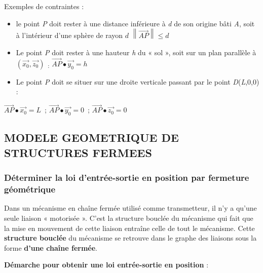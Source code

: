 Exemples de contraintes :

\begin{itemize}
\item
  le point \emph{P} doit rester à une distance inférieure à \emph{d} de
  son origine bâti \emph{A}, soit à l'intérieur d'une sphère de rayon
  \(d\) \(\left\| \overrightarrow{AP} \right\| \leq d\)
\item
  Le point \emph{P} doit rester à une hauteur \emph{h} du « sol », soit
  sur un plan parallèle à
  \((\overrightarrow{x_{0}},\overrightarrow{z_{0}})\)\textsubscript{~:}
  \(\overrightarrow{AP} \bullet \overrightarrow{y_{0}} = h\)
\item
  Le point \emph{P} doit se situer sur une droite verticale passant par
  le point \emph{D}(\emph{L},0,0) :
\end{itemize}

\(\overrightarrow{AP} \bullet \overrightarrow{x_{0}} = L\)~;
\(\overrightarrow{AP} \bullet \overrightarrow{y_{0}} = 0\)~;
\(\overrightarrow{AP} \bullet \overrightarrow{z_{0}} = 0\)~

\subsection{MODELE GEOMETRIQUE DE STRUCTURES
FERMEES}\label{modele-geometrique-de-structures-fermees-1}

\subsubsection{Déterminer la loi d'entrée-sortie en position par
fermeture
géométrique}\label{duxe9terminer-la-loi-dentruxe9e-sortie-en-position-par-fermeture-guxe9omuxe9trique}

Dans un mécanisme en chaîne fermée utilisé comme transmetteur, il n'y a
qu'une seule liaison « motorisée ». C'est la structure bouclée du
mécanisme qui fait que la mise en mouvement de cette liaison entraîne
celle de tout le mécanisme. Cette \textbf{structure bouclée} du
mécanisme se retrouve dans le graphe des liaisons sous la forme
\textbf{d'une chaîne fermée}.

\textbf{Démarche pour obtenir une loi entrée-sortie en position} :

